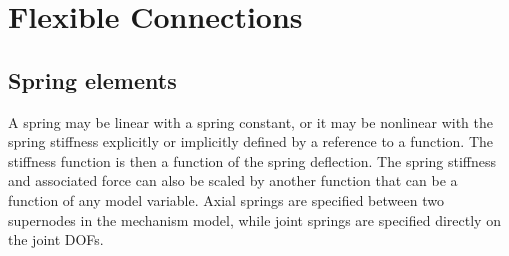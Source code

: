 %
%

%
%

\chapter{Flexible Connections}
\label{c:Flexible Connections}

\section{Spring elements}
\label{s:Spring elements}

A spring may be linear with a spring constant, or it may be nonlinear with the
spring stiffness explicitly or implicitly defined by a reference to a function.
The stiffness function is then a function of the spring deflection.
The spring stiffness and associated force can also be scaled by another function
that can be a function of any model variable.
Axial springs are specified between two supernodes in the mechanism model,
while joint springs are specified directly on the joint DOFs.


